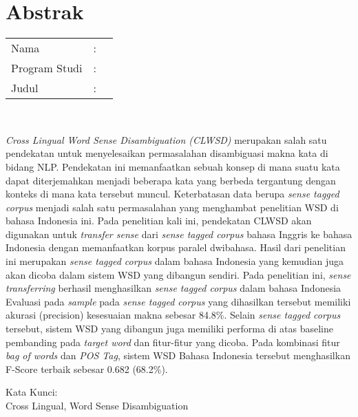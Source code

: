 %
%
%

\chapter*{Abstrak}

\vspace*{0.2cm}

\noindent \begin{tabular}{l l p{10cm}}
	Nama&: & \penulis \\
	Program Studi&: & \program \\
	Judul&: & \judul \\
\end{tabular} \\ 

\vspace*{0.5cm}

\noindent
\textit{Cross Lingual Word Sense Disambiguation (CLWSD)} merupakan salah satu pendekatan untuk menyelesaikan permasalahan disambiguasi makna kata di bidang NLP. Pendekatan ini memanfaatkan sebuah konsep di mana suatu kata dapat diterjemahkan menjadi beberapa kata yang berbeda tergantung dengan konteks di mana kata tersebut muncul. Keterbatasan data berupa \textit{sense tagged corpus} menjadi salah satu permasalahan yang menghambat penelitian WSD di bahasa Indonesia ini. Pada penelitian kali ini, pendekatan CLWSD akan digunakan untuk \textit{transfer sense} dari \textit{sense tagged corpus} bahasa Inggris ke bahasa Indonesia dengan memanfaatkan korpus paralel dwibahasa. Hasil dari penelitian ini merupakan \textit{sense tagged corpus} dalam bahasa Indonesia yang kemudian juga akan dicoba dalam sistem WSD yang dibangun sendiri. Pada penelitian ini, \textit{sense transferring} berhasil menghasilkan \textit{sense tagged corpus} dalam bahasa Indonesia Evaluasi pada \textit{sample} pada \textit{sense tagged corpus} yang dihasilkan tersebut memiliki akurasi (precision) kesesuaian makna sebesar 84.8\%. Selain \textit{sense tagged corpus} tersebut, sistem WSD yang dibangun juga memiliki performa di atas baseline pembanding pada \textit{target word} dan fitur-fitur yang dicoba. Pada kombinasi fitur \textit{bag of words} dan \textit{POS Tag}, sistem WSD Bahasa Indonesia tersebut menghasilkan F-Score terbaik sebesar 0.682 (68.2\%).


\vspace*{0.2cm}

\noindent Kata Kunci: \\ 
\noindent Cross Lingual, Word Sense Disambiguation

\newpage